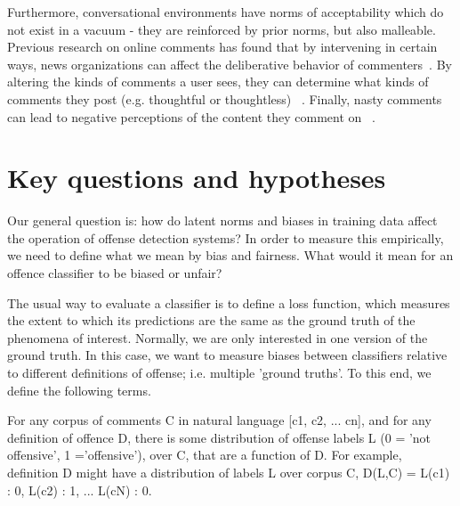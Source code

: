 \documentclass[runningheads,a4paper]{llncs}
\begin{document}
Furthermore, conversational environments have norms of acceptability which do not exist in a vacuum - they are reinforced by prior norms, but also malleable. Previous research on online comments has found that by intervening in certain ways, news organizations can affect the deliberative behavior of commenters~\cite{stroud2015changing}. By altering the kinds of comments a user sees, they can determine what kinds of comments they post (e.g. thoughtful or thoughtless) ~\cite{sukumaran2011normative}. Finally, nasty comments can lead to negative perceptions of the content they comment on ~\cite{anderson2014nasty}.


\section{Key questions and hypotheses}



Our general question is: how do latent norms and biases in training data affect the operation of offense detection systems? In order to measure this empirically, we need to define what we mean by bias and fairness. What would it mean for an offence classifier to be biased or unfair?

The usual way to evaluate a classifier is to define a loss function, which measures the extent to which its predictions are the same as the ground truth of the phenomena of interest. Normally, we are only interested in one version of the ground truth. In this case, we want to measure biases between classifiers relative to different definitions of offense; i.e. multiple 'ground truths'. To this end, we define the following terms.

For any corpus of comments C in natural language [c1, c2, ... cn], and for any definition of offence D, there is some distribution of offense labels L (0 = 'not offensive', 1 ='offensive'), over C, that are a function of D. For example, definition D might have a distribution of labels L over corpus C, D(L,C) = {L(c1) : 0, L(c2) : 1, ... L(cN) : 0}.
\end{document}
